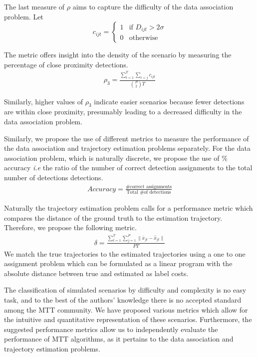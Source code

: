 \documentclass[journal]{IEEEtran}
\begin{document}
The last measure of $\rho$ aims to capture the difficulty of the data association problem. Let
\[c_{ijt} = 
\begin{cases}
1 & \text{if $D_{ijt} > 2\sigma$}\\
0 & \text{otherwise}
\end{cases}\]

The metric offers insight into the density of the scenario by measuring the percentage of close proximity detections. 
\begin{align}
\rho_{3} =  \frac{\sum\limits_{t=1}^{T}\sum\limits_{i<j}c_{ijt}}{\binom{P}{2} T}
\end{align}

Similarly, higher values of $\rho_{3}$ indicate easier scenarios because fewer detections are within close proximity, presumably leading to a decreased difficulty in the data association problem. 

Similarly, we propose the use of different metrics to measure the performance of the data association and trajectory estimation problems separately. For the data association problem, which is naturally discrete, we propose the use of \% accuracy \textit{i.e} the ratio of the number of correct detection assignments to the total number of detections detections.
\begin{align}
Accuracy =  \frac{\text{\# correct assignments}}{\text{Total \# of detections}}
\end{align}

Naturally the trajectory estimation problem calls for a performance metric which compares the distance of the ground truth to the estimation trajectory. Therefore, we propose the following metric. 
\begin{align}
	\delta = \frac{\sum\limits_{t=1}^{T}\sum\limits_{j=1}^{P}\| \bar{x}_{jt} - \hat{x}_{jt} \|}{PT}
\end{align}
We match the true trajectories to the estimated trajectories using a one to one assignment problem which can be formulated as a linear program with the absolute distance between true and estimated as label costs.

The classification of simulated scenarios by difficulty and complexity is no easy task, and to the best of the authors' knowledge there is no accepted standard among the MTT community. We have proposed various metrics which allow for the intuitive and quantitative representation of these scenarios. Furthermore, the suggested performance metrics allow us to independently evaluate the performance of MTT algorithms, as it pertains to the data association and trajectory estimation problems. 
\end{document}
